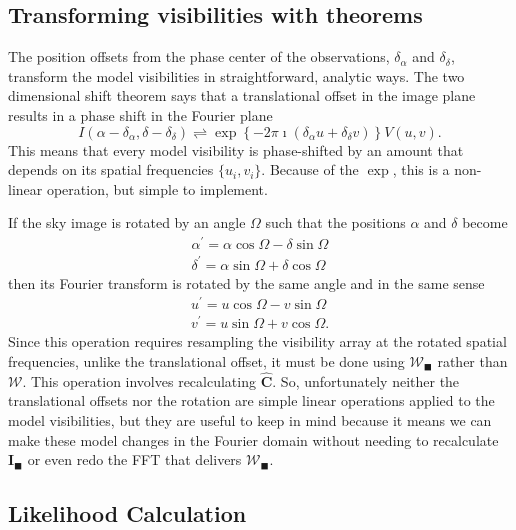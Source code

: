\documentclass[modern]{aastex62}
\newcommand{\im}{\boldsymbol{I}_\blacksquare}
\newcommand{\vm}{\boldsymbol{\mathcal{W}}} %
\begin{document}
\subsection{Transforming visibilities with theorems}
The position offsets from the phase center of the observations, $\delta_\alpha$ and $\delta_\delta$, transform the model visibilities in straightforward, analytic ways. The two dimensional shift theorem says that a translational offset in the image plane results in a phase shift in the Fourier plane \citep{bracewell00}
\begin{equation}
I(\alpha - \delta_\alpha, \delta - \delta_\delta) \rightleftharpoons \exp \left \{ -2 \pi \imath (\delta_\alpha u + \delta_\delta v) \right \} V(u, v).
\end{equation}
This means that every model visibility is phase-shifted by an amount that depends on its spatial frequencies $\{u_i, v_i\}$. Because of the $\exp$, this is a non-linear operation, but simple to implement.

If the sky image is rotated by an angle $\Omega$ such that the positions $\alpha$ and $\delta$ become
\begin{eqnarray}
\alpha^\prime = \alpha \cos \Omega - \delta \sin \Omega \\
\delta^\prime = \alpha \sin \Omega + \delta \cos \Omega
\end{eqnarray}
then its Fourier transform is rotated by the same angle and in the same sense \citep{bracewell00}
\begin{eqnarray}
u^\prime = u \cos \Omega - v \sin \Omega \\
v^\prime = u \sin \Omega + v \cos \Omega.
\end{eqnarray}
Since this operation requires resampling the visibility array at the rotated spatial frequencies, unlike the translational offset, it must be done using $\vm_\blacksquare$ rather than $\vm$. This operation involves recalculating $\hat{\boldsymbol{C}}$. So, unfortunately neither the translational offsets nor the rotation are simple linear operations applied to the model visibilities, but they are useful to keep in mind because it means we can make these model changes in the Fourier domain without needing to recalculate $\im$ or even redo the FFT that delivers $\vm_\blacksquare$.

\subsection{Likelihood Calculation}
\end{document}
